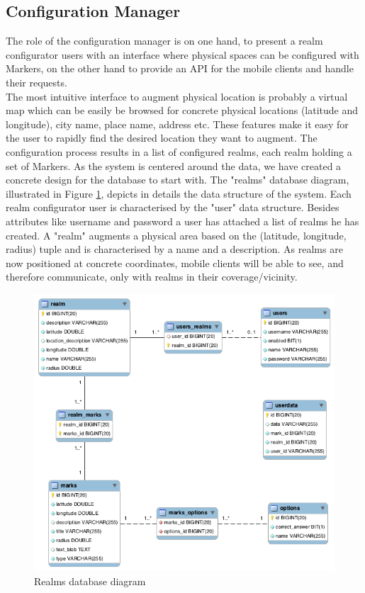 \subsection{Configuration Manager} %
\label{sub:configuration_manager}
\noindent The role of the configuration manager is on one hand, to present a realm configurator users with an interface where physical spaces can be configured with Markers, on the other hand to provide an API for the mobile clients and handle their requests.
\\

\noindent The most intuitive interface to augment physical location is probably a virtual map which can be easily be browsed for concrete physical locations (latitude and longitude), city name, place name, address etc. These features make it easy for the user to rapidly find the desired location they want to augment. The configuration process results in a list of configured realms, each realm holding a set of Markers. As the system is centered around the data, we have created a concrete design for the database to start with. The  "realms" database diagram, illustrated in Figure \ref{fig.db_structure}, depicts in details the data structure of the system. Each realm configurator user is characterised by the "user" data structure. Besides attributes like username and password a user has attached a list of realms he has created. A "realm" augments a physical area based on the (latitude, longitude, radius) tuple and is characterised by a name and a description. As realms are now positioned at concrete coordinates, mobile clients will be able to see, and therefore communicate, only with realms in their coverage/vicinity.
\begin{figure}[H]
	\centering
	\includegraphics[width=1.0\linewidth]{fig/db_structure}
	\caption{Realms database diagram}
	\label{fig.db_structure}
\end{figure}
